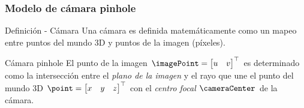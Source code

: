 \begin{frame}
	\frametitle{Modelo de cámara pinhole}

	\begin{block}{Definición - Cámara}
		Una cámara es definida matemáticamente como un mapeo entre puntos del mundo 3D y puntos de la imagen (píxeles).
	\end{block}

	\begin{block}{Cámara pinhole}
		El punto de la imagen $\imagePoint=\begin{bmatrix}u & v\end{bmatrix}^{\top}$ es determinado como la intersección entre el \emph{plano de la imagen} y el rayo que une el punto del mundo 3D $\point=\begin{bmatrix}x & y & z\end{bmatrix}^{\top}$ con el \emph{centro focal} $\cameraCenter$ de la cámara.
	\end{block}

	\vspace{-0.5em}
	\begin{figure}[!htb]
		\centering
		\hfill
	\end{figure}

\end{frame}


